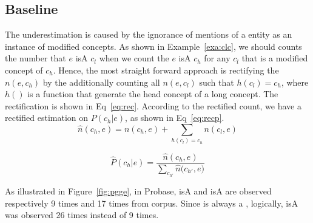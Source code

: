 
\subsection{Baseline}
The underestimation is caused by the ignorance of mentions of a entity as an instance of modified concepts. As shown in Example~\ref{exa:clc}, we should counts the number that $e$ isA $c_{l}$ when we count the $e$ isA $c_{h}$ for any $c_l$ that is a modified concept of $c_h$.
Hence, the most straight forward approach is rectifying the $n(e, c_h)$ by the additionally counting
all $n(e, c_l)$ such that $h(c_l)=c_h$, where $h()$ is a function that generate the head concept of a long concept. The rectification is shown in Eq~\ref{eq:rec}. According to the rectified count, we have a rectified estimation on $P(c_h|e)$, as shown in Eq~\ref{eq:recp}.
\begin{equation}
\hat{n}(c_h, e)={n}(c_h, e)+\sum_{ h(c_l)=c_h} n(c_l,e)
\label{eq:rec}
\end{equation}

\begin{equation}
\hat{P}(c_h|e)=\frac{\hat{n}(c_h, e)}{\sum_{c_{h'}}{\hat{n}(c_{h'}}, e)}
\label{eq:recp}
\end{equation}

\begin{example}
\label{exa:clc}
As illustrated in Figure~\ref{fig:pgge}, in Probase,  isA   and  isA  are observed respectively 9 times and 17 times from corpus. Since  is always a ,  logically,  isA  was observed 26 times instead of 9 times.
\end{example}


